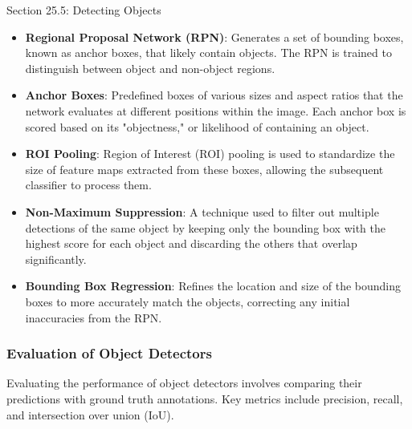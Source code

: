 \begin{notes}{Section 25.5: Detecting Objects}
    \begin{highlight}
    
        \begin{itemize}
            \item \textbf{Regional Proposal Network (RPN)}: Generates a set of bounding boxes, known as anchor boxes, that likely contain objects. The RPN is trained to distinguish between object and 
            non-object regions.
            \item \textbf{Anchor Boxes}: Predefined boxes of various sizes and aspect ratios that the network evaluates at different positions within the image. Each anchor box is scored based on its 
            "objectness," or likelihood of containing an object.
            \item \textbf{ROI Pooling}: Region of Interest (ROI) pooling is used to standardize the size of feature maps extracted from these boxes, allowing the subsequent classifier to process them.
            \item \textbf{Non-Maximum Suppression}: A technique used to filter out multiple detections of the same object by keeping only the bounding box with the highest score for each object and 
            discarding the others that overlap significantly.
            \item \textbf{Bounding Box Regression}: Refines the location and size of the bounding boxes to more accurately match the objects, correcting any initial inaccuracies from the RPN.
        \end{itemize}
    
    \end{highlight}
    
    \subsubsection*{Evaluation of Object Detectors}
    
    Evaluating the performance of object detectors involves comparing their predictions with ground truth annotations. Key metrics include precision, recall, and intersection over union (IoU).
    
    \begin{highlight}
    

\end{highlight}
\end{notes}
